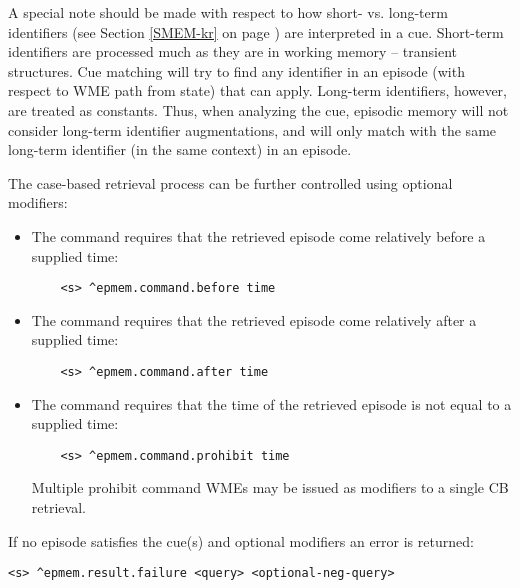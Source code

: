 A special note should be made with respect to how short- vs. long-term identifiers (see Section \ref{SMEM-kr} on page \pageref{SMEM-kr}) are interpreted in a cue.  
Short-term identifiers are processed much as they are in working memory -- transient structures.  
Cue matching will try to find any identifier in an episode (with respect to WME path from state) that can apply.  
Long-term identifiers, however, are treated as constants. 
Thus, when analyzing the cue, episodic memory will not consider long-term identifier augmentations, and will only match with the same long-term identifier (in the same context) in an episode.

The case-based retrieval process can be further controlled using optional modifiers:

\vspace{-8pt}
\begin{itemize}
\item 
	The  command requires that the retrieved episode come relatively before a supplied time:
	\vspace{-6pt}
	\begin{verbatim}
	<s> ^epmem.command.before time
	\end{verbatim}
	\vspace{-6pt}
\item 
	The  command requires that the retrieved episode come relatively after a supplied time:
	\vspace{-6pt}
	\begin{verbatim}
	<s> ^epmem.command.after time
	\end{verbatim}
	\vspace{-6pt}
\item 
	The  command requires that the time of the retrieved episode is not equal to a supplied time:
	\vspace{-6pt}
	\begin{verbatim}
	<s> ^epmem.command.prohibit time
	\end{verbatim}
	\vspace{-6pt}
	Multiple prohibit command WMEs may be issued as modifiers to a single CB retrieval.
	\vspace{-6pt}
\end{itemize}
\vspace{-12pt}

If no episode satisfies the cue(s) and optional modifiers an error is returned:

\begin{verbatim}
<s> ^epmem.result.failure <query> <optional-neg-query>
\end{verbatim}

